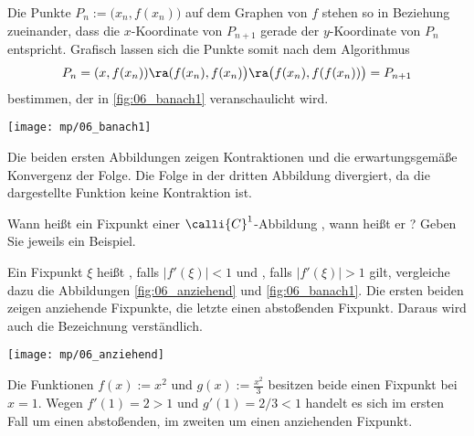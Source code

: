 \begin{antwort}
  Die Punkte $P_n:=\big(x_n,f(x_n)\big)$ auf dem Graphen 
  von $f$ stehen so in Beziehung zueinander, dass die 
  $x$-Koordinate von $P_{n+1}$ gerade der $y$-Koordinate 
  von $P_n$ entspricht. Grafisch lassen sich die Punkte 
  somit nach dem Algorithmus
  \[
  P_n = ( x, f(x_n) )  \ra 
  ( f(x_n), f(x_n) \big)  \ra
  \big( f(x_n), f(f(x_n)) \big) = P_{n+1}
  \]
  bestimmen, der in \Abb\ref{fig:06_banach1} veranschaulicht wird. 

  \begin{center}
    \texttt{[image: mp/06\_banach1]}
    \label{fig:06_banach1}
  \end{center}

  \noindent
  Die beiden ersten Abbildungen 
  zeigen Kontraktionen und die erwartungsgemäße Konvergenz 
  der Folge. Die Folge in der dritten Abbildung 
  divergiert, da die dargestellte Funktion 
  keine Kontraktion ist. \AntEnd
\end{antwort}

\begin{frage}
  Wann heißt ein Fixpunkt einer $\calli{C}^1$-Abbildung 
  , wann heißt er ? Geben Sie jeweils 
  ein Beispiel.
\end{frage}

\begin{antwort}
  Ein Fixpunkt $\xi$ heißt , falls
  $|f'(\xi)|<1$ und , falls 
  $|f'(\xi)|>1$ gilt, vergleiche dazu die Abbildungen \ref{fig:06_anziehend} 
  und \ref{fig:06_banach1}. 
  Die ersten beiden 
  zeigen anziehende Fixpunkte, die letzte einen 
  abstoßenden Fixpunkt. Daraus wird auch die Bezeichnung 
  verständlich.

  \begin{center}
    \texttt{[image: mp/06\_anziehend]}
    \label{fig:06_anziehend}
  \end{center}

  Die Funktionen $f(x):=x^2$ und 
  $g(x):=\frac{x^2}{3}$ besitzen beide einen Fixpunkt bei $x=1$. Wegen 
  $f'(1)=2>1$ und $g'(1)=2/3<1$ handelt es sich im ersten Fall um einen 
  abstoßenden, im zweiten um einen anziehenden Fixpunkt. 
  \AntEnd
\end{antwort}

